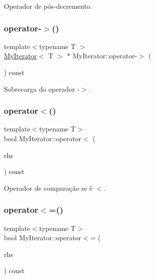 Operador de pós-\/decremento. 

\mbox{\label{classsc_1_1MyIterator_a5d82243284e5b50a286e9b45b4566623}} 
\subsubsection{\texorpdfstring{operator-\/$>$()}{operator->()}}
{\footnotesize\ttfamily template$<$typename T $>$ \\
\hyperlink{classsc_1_1MyIterator}{My\+Iterator}$<$ T $>$ $\ast$ My\+Iterator\+::operator-\/$>$ (\begin{DoxyParamCaption}\item[{void}]{ }\end{DoxyParamCaption}) const}



Sobrecarga do operador -\/$>$. 

\mbox{\label{classsc_1_1MyIterator_a9ae3587ee793ad0049a1c9b8d0780ba6}} 
\subsubsection{\texorpdfstring{operator$<$()}{operator<()}}
{\footnotesize\ttfamily template$<$typename T$>$ \\
bool My\+Iterator\+::operator$<$ (\begin{DoxyParamCaption}\item[{const \hyperlink{classsc_1_1MyIterator}{My\+Iterator}$<$ T $>$ \&}]{rhs }\end{DoxyParamCaption}) const}



Operador de comparação se é $<$. 

\mbox{\label{classsc_1_1MyIterator_ad8c2b40a518b2f112784f8fb2fe3e8fe}} 
\subsubsection{\texorpdfstring{operator$<$=()}{operator<=()}}
{\footnotesize\ttfamily template$<$typename T$>$ \\
bool My\+Iterator\+::operator$<$= (\begin{DoxyParamCaption}\item[{const \hyperlink{classsc_1_1MyIterator}{My\+Iterator}$<$ T $>$ \&}]{rhs }\end{DoxyParamCaption}) const}



